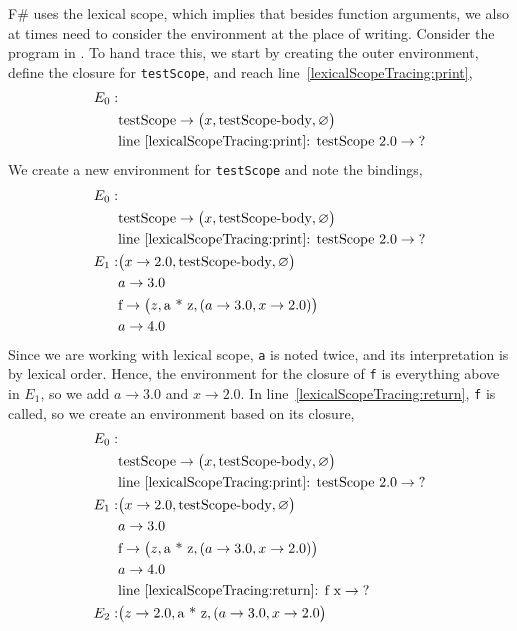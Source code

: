 \documentclass[fsharpnotes.tex]{subfiles}
\begin{document}
F\# uses the lexical scope, which implies that besides function arguments, we also at times need to consider the environment at the place of writing. Consider the program in .
%
%
To hand trace this, we start by creating the outer environment, define the closure for \lstinline!testScope!, and reach line~\ref{lexicalScopeTracing:print},
\begin{align*}
  E_0:&\\
      &\text{testScope} \rightarrow \big(x, \text{testScope-body}, \varnothing\big)\\
      & \text{line~\ref{lexicalScopeTracing:print}: testScope 2.0} \rightarrow \text{?}\\
\end{align*}
We create a new environment for \lstinline!testScope! and note the bindings,
\begin{align*}
  E_0:&\\
      &\text{testScope} \rightarrow \big(x, \text{testScope-body}, \varnothing\big)\\
      & \text{line~\ref{lexicalScopeTracing:print}: testScope 2.0} \rightarrow \text{?}\\
  E_1: & \big(x\rightarrow 2.0, \text{testScope-body}, \varnothing\big)\\
      & a \rightarrow 3.0\\
      & \text{f} \rightarrow \big(z, \text{a * z}, (a \rightarrow 3.0, x\rightarrow 2.0)\big)\\
      & a \rightarrow 4.0
\end{align*}
Since we are working with lexical scope, \lstinline!a! is noted twice, and its interpretation is by lexical order. Hence, the environment for the closure of \lstinline!f! is everything above in $E_1$, so we add $a \rightarrow 3.0$ and $x \rightarrow 2.0$. In line~\ref{lexicalScopeTracing:return}, \lstinline!f! is called, so we create an environment based on its closure,
\begin{align*}
  E_0:&\\
      &\text{testScope} \rightarrow \big(x, \text{testScope-body}, \varnothing\big)\\
      & \text{line~\ref{lexicalScopeTracing:print}: testScope 2.0} \rightarrow \text{?}\\
  E_1: & \big(x\rightarrow 2.0, \text{testScope-body}, \varnothing\big)\\
      & a \rightarrow 3.0\\
      & \text{f} \rightarrow \big(z, \text{a * z}, (a \rightarrow 3.0, x\rightarrow 2.0)\big)\\
      & a \rightarrow 4.0 \\
      & \text{line~\ref{lexicalScopeTracing:return}: f x} \rightarrow \text{?}\\
  E_2: & \big(z \rightarrow 2.0, \text{a * z}, (a \rightarrow 3.0, x\rightarrow 2.0\big)\\
\end{align*}
\end{document}
